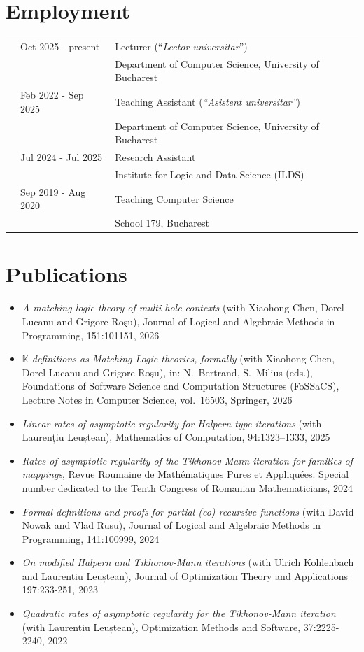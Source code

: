 \documentclass[letterpaper,11pt,oneside]{article}
\begin{document}
\noindent
\section{Employment}
\normalsize
\begin{tabular}{@{} l l l}
        & Oct 2025 - present & Lecturer (``\textit{Lector universitar}'') \\
        &                    & Department of Computer Science, University of Bucharest \\
        & Feb 2022 - Sep 2025 & Teaching Assistant (\textit{``Asistent universitar''}) \\ 
        &                & Department of Computer Science, University of Bucharest \\
        & Jul 2024 - Jul 2025 & Research Assistant \\ 
        &                    & Institute for Logic and Data Science (ILDS) \\
        & Sep 2019 - Aug 2020    & Teaching Computer Science \\
        &                & School 179, Bucharest 
\end{tabular}


\noindent
\section{Publications} 
\normalsize
\begin{itemize}
    \item \emph{A matching logic theory of multi-hole contexts} (with Xiaohong Chen, Dorel Lucanu and Grigore Ro\c{s}u), Journal of Logical and Algebraic Methods in Programming, 151:101151, 2026
    \item \emph{$\mathbb{K}$ definitions as Matching Logic theories, formally} (with Xiaohong Chen, Dorel Lucanu and Grigore Ro\c{s}u), in: N.~Bertrand, S.~Milius (eds.), Foundations of Software Science and Computation Structures (FoSSaCS), Lecture Notes in Computer Science, vol.~16503, Springer, 2026
    \item \emph{Linear rates of asymptotic regularity for Halpern-type iterations} (with Laurențiu Leuștean), Mathematics of Computation, 94:1323--1333, 2025
    \item \emph{Rates of asymptotic regularity of the Tikhonov-Mann iteration for families of mappings}, {Revue Roumaine de Math\'{e}matiques Pures et Appliqu\'{e}es. Special number dedicated to the Tenth Congress of Romanian Mathematicians}, 2024
    \item \emph{Formal definitions and proofs for partial (co) recursive functions} (with David Nowak and Vlad Rusu), Journal of Logical and Algebraic Methods in Programming, 141:100999, 2024
    \item \emph{On modified Halpern and Tikhonov-Mann iterations} (with Ulrich Kohlenbach and Laurențiu Leuștean), Journal of Optimization Theory and Applications 197:233-251, 2023
    \item \emph{Quadratic rates of asymptotic regularity for the Tikhonov-Mann iteration} (with Laurențiu Leuștean), Optimization Methods and Software, 37:2225-2240, 2022
\end{itemize} 
\end{document}
